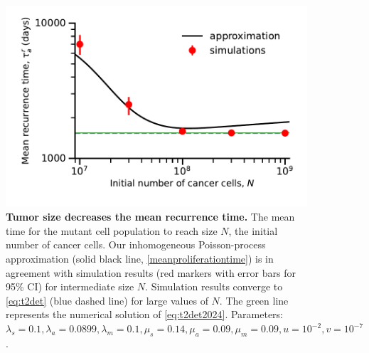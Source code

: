 \documentclass[12pt]{extarticle}
\begin{document}
\begin{figure}
\vspace*{1\baselineskip}
\includegraphics[width=1\textwidth]{Figures/ProliferationTime.pdf}
\caption{\textbf{Tumor size decreases the mean recurrence time.}
The mean time for the mutant cell population to reach size $N$, the initial number of cancer cells.
Our inhomogeneous Poisson-process approximation (solid black line, \cref{meanproliferationtime}) is in agreement with simulation results (red markers with error bars for 95\% CI) for intermediate size $N$.
Simulation results converge to \cref{eq:t2det} (blue dashed line) for large values of $N$. The green line represents the numerical solution of \cref{eq:t2det2024}. %
Parameters: $\lambda_s=0.1,\lambda_a=0.0899,\lambda_m=0.1,\mu_s=0.14,\mu_a=0.09,\mu_m=0.09, u=10^{-2}, v=10^{-7}$.}
\label{proliferationFigure}
\end{figure}



\newpage 
\end{document}
